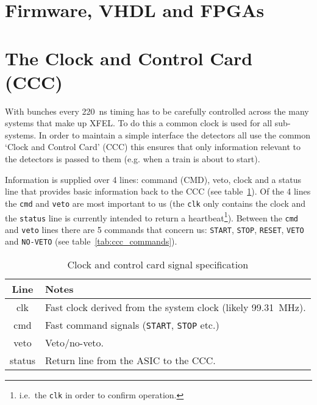     \section{Firmware, VHDL and FPGAs} %
    \label{sec:firmware_vhdl_and_fpgas}
    
    \section{The Clock and Control Card (CCC)} %
    \label{sec:the_clock_and_control_card_ccc}
    With bunches every 220~ns timing has to be carefully controlled across the many systems that make up XFEL. To do this a common clock is used for all sub-systems. In order to maintain a simple interface the detectors all use the common `Clock and Control Card' (CCC) this ensures that only information relevant to the detectors is passed to them (e.g. when a train is about to start). 
    
    Information is supplied over 4 lines: command (CMD), veto, clock and a status line that provides basic information back to the CCC (see table~\ref{tab:ccc_spec}). Of the 4 lines the \texttt{cmd} and \texttt{veto} are most important to us (the \texttt{clk} only contains the clock and the \texttt{status} line is currently intended to return a heartbeat\footnote{i.e.\ the \texttt{clk} in order to confirm operation.}). Between the \texttt{cmd} and \texttt{veto} lines there are 5 commands that concern us: \texttt{START}, \texttt{STOP}, \texttt{RESET}, \texttt{VETO} and \texttt{NO-VETO} (see table~\ref{tab:ccc_commands}).
    \begin{table}
        \begin{center}
            \begin{tabular}{c|l}
                Line & Notes \\
                \hline
                clk    & Fast clock derived from the system clock (likely 99.31~MHz).\\
                cmd    & Fast command signals (\texttt{START}, \texttt{STOP} etc.)   \\
                veto   & Veto/no-veto.                                               \\
                status & Return line from the ASIC to the CCC.                       \\
            \end{tabular}
        \end{center}
        \caption{Clock and control card signal specification}
        \label{tab:ccc_spec}
    \end{table}
    
